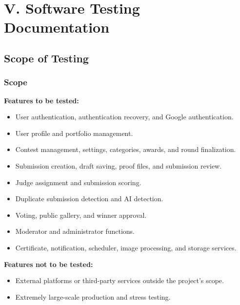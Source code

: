 \newpage

\section*{V. Software Testing Documentation}
\setcounter{section}{5}

\renewcommand{\thesubsection}{\arabic{subsection}}
\renewcommand{\thesubsubsection}{\thesubsection.\arabic{subsubsection}}
\setcounter{subsection}{0}

\subsection{Scope of Testing}
\label{subsec:testing-scope}

\subsubsection{Scope}
\label{subsubsec:testing-scope-features}

\textbf{Features to be tested:}
\begin{itemize}[leftmargin=1.5em, nosep]
    \item User authentication, authentication recovery, and Google authentication.
    \item User profile and portfolio management.
    \item Contest management, settings, categories, awards, and round finalization.
    \item Submission creation, draft saving, proof files, and submission review.
    \item Judge assignment and submission scoring.
    \item Duplicate submission detection and AI detection.
    \item Voting, public gallery, and winner approval.
    \item Moderator and administrator functions.
    \item Certificate, notification, scheduler, image processing, and storage services.
\end{itemize}

\textbf{Features not to be tested:}
\begin{itemize}[leftmargin=1.5em, nosep]
    \item External platforms or third-party services outside the project's scope.
    \item Extremely large-scale production and stress testing.
\end{itemize}

